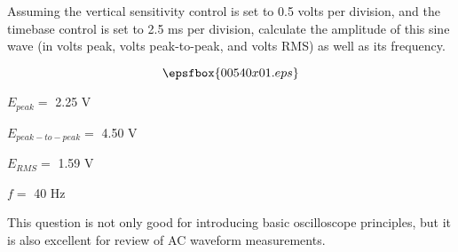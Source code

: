 

Assuming the vertical sensitivity control is set to 0.5 volts per division, and the timebase control is set to 2.5 ms per division, calculate the amplitude of this sine wave (in volts peak, volts peak-to-peak, and volts RMS) as well as its frequency.

$$\epsfbox{00540x01.eps}$$







\medskip
\item{} $E_{peak} =$ 2.25 V
\item{} $E_{peak-to-peak} =$ 4.50 V
\item{} $E_{RMS} =$ 1.59 V
\item{} $f =$ 40 Hz
\medskip







This question is not only good for introducing basic oscilloscope principles, but it is also excellent for review of AC waveform measurements.




